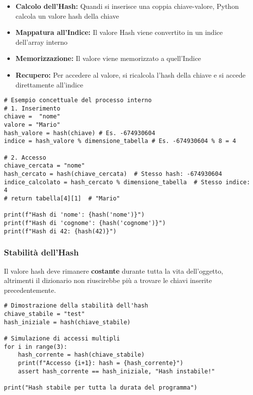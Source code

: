 \begin{itemize}
    \item \textbf{Calcolo dell'Hash:} Quandi si inserisce una coppia chiave-valore, Python calcola un valore hash della chiave
    \item \textbf{Mappatura all'Indice:} Il valore Hash viene convertito in un indice dell'array interno
    \item \textbf{Memorizzazione:} Il valore viene memorizzato a quell'Indice
    \item \textbf{Recupero:} Per accedere al valore, si ricalcola l'hash della chiave e si accede direttamente all'indice
\end{itemize}
\vspace{0.5cm}

\begin{lstlisting}
# Esempio concettuale del processo interno
# 1. Inserimento
chiave =  "nome"
valore = "Mario"
hash_valore = hash(chiave) # Es. -674930604
indice = hash_valore % dimensione_tabella # Es. -674930604 % 8 = 4

# 2. Accesso
chiave_cercata = "nome"
hash_cercato = hash(chiave_cercata)  # Stesso hash: -674930604
indice_calcolato = hash_cercato % dimensione_tabella  # Stesso indice: 4
# return tabella[4][1]  # "Mario"

print(f"Hash di 'nome': {hash('nome')}")
print(f"Hash di 'cognome': {hash('cognome')}")
print(f"Hash di 42: {hash(42)}")
\end{lstlisting}
\vspace{0.5cm}

\subsubsection{Stabilità dell'Hash}\label{StabilitàHashDict}
Il valore hash deve rimanere \textbf{costante} durante tutta la vita dell'oggetto, altrimenti il dizionario non riuscirebbe più a trovare 
le chiavi inserite precedentemente.
\vspace{0.3cm}

\begin{lstlisting}
# Dimostrazione della stabilità dell'hash
chiave_stabile = "test"
hash_iniziale = hash(chiave_stabile)

# Simulazione di accessi multipli
for i in range(3):
    hash_corrente = hash(chiave_stabile)
    print(f"Accesso {i+1}: hash = {hash_corrente}")
    assert hash_corrente == hash_iniziale, "Hash instabile!"

print("Hash stabile per tutta la durata del programma")
\end{lstlisting}
\vspace{0.5cm}





